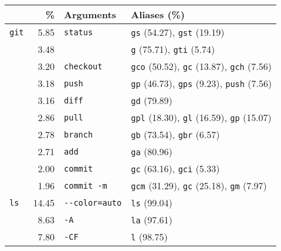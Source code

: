 \newcommand{\numx}[1]{{\small (\num{#1})}}
\begin{tabular}{@{}lrll@{}}
    \toprule
                &           \% &            Arguments &                                                                 Aliases (\%) \\
    \midrule
     \verb|git| &   \num{5.85} &        \verb|status| &                              \verb|gs| \numx{54.27}, \verb|gst| \numx{19.19} \\
                &   \num{3.48} &              \verb|| &                                \verb|g| \numx{75.71}, \verb|gti| \numx{5.74} \\
                &   \num{3.20} &      \verb|checkout| &      \verb|gco| \numx{50.52}, \verb|gc| \numx{13.87}, \verb|gch| \numx{7.56} \\
                &   \num{3.18} &          \verb|push| &      \verb|gp| \numx{46.73}, \verb|gps| \numx{9.23}, \verb|push| \numx{7.56} \\
                &   \num{3.16} &          \verb|diff| &                                                       \verb|gd| \numx{79.89} \\
                &   \num{2.86} &          \verb|pull| &      \verb|gpl| \numx{18.30}, \verb|gl| \numx{16.59}, \verb|gp| \numx{15.07} \\
                &   \num{2.78} &        \verb|branch| &                               \verb|gb| \numx{73.54}, \verb|gbr| \numx{6.57} \\
                &   \num{2.71} &           \verb|add| &                                                       \verb|ga| \numx{80.96} \\
                &   \num{2.00} &        \verb|commit| &                               \verb|gc| \numx{63.16}, \verb|gci| \numx{5.33} \\
                &   \num{1.96} &     \verb|commit -m| &       \verb|gcm| \numx{31.29}, \verb|gc| \numx{25.18}, \verb|gm| \numx{7.97} \\
    \midrule
      \verb|ls| &  \num{14.45} &  \verb|--color=auto| &                                                       \verb|ls| \numx{99.04} \\
                &   \num{8.63} &            \verb|-A| &                                                       \verb|la| \numx{97.61} \\
                &   \num{7.80} &           \verb|-CF| &                                                        \verb|l| \numx{98.75} \\

\end{tabular}
